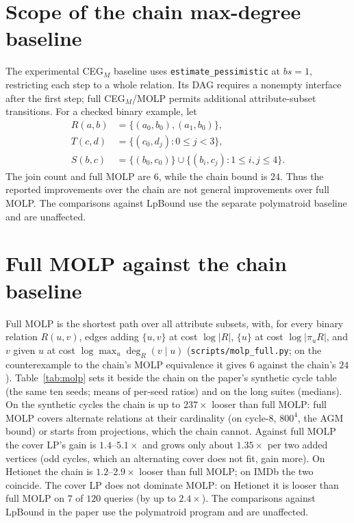 \documentclass[11pt]{article}
\begin{document}
\section{Scope of the chain max-degree baseline}
The experimental CEG$_M$ baseline uses \texttt{estimate\_pessimistic} at $bs=1$, restricting each step to a whole relation. Its DAG requires a nonempty interface after the first step; full CEG$_M$/MOLP permits additional attribute-subset transitions. For a checked binary example, let
\[
\begin{aligned}
R(a,b)&=\{(a_0,b_0),(a_1,b_0)\},\\
T(c,d)&=\{(c_0,d_j):0\le j<3\},\\
S(b,c)&=\{(b_0,c_0)\}\cup\{(b_i,c_j):1\le i,j\le4\}.
\end{aligned}
\]
The join count and full MOLP are $6$, while the chain bound is $24$. Thus the reported improvements over the chain are not general improvements over full MOLP. The comparisons against LpBound use the separate polymatroid baseline and are unaffected.

\section{Full MOLP against the chain baseline}
Full MOLP is the shortest path over all attribute subsets, with, for every
binary relation $R(u,v)$, edges adding $\{u,v\}$ at cost $\log|R|$, $\{u\}$
at cost $\log|\pi_uR|$, and $v$ given $u$ at cost $\log\max_u\deg_R(v\mid u)$
(\texttt{scripts/molp\_full.py}; on the counterexample to the chain's MOLP
equivalence it gives $6$ against the chain's $24$). Table~\ref{tab:molp} sets it beside the chain on the
paper's synthetic cycle table (the same ten seeds; means of per-seed
ratios) and on the long suites (medians). On the synthetic cycles the
chain is up to $237\times$ looser than full MOLP: full MOLP covers alternate
relations at their cardinality (on cycle-$8$, $800^4$, the AGM bound) or
starts from projections, which the chain cannot. Against full MOLP the
cover LP's gain is $1.4$--$5.1\times$ and grows only about $1.35\times$ per
two added vertices (odd cycles, which an alternating cover does not fit,
gain more). On Hetionet the chain is
$1.2$--$2.9\times$ looser than full MOLP; on IMDb the two coincide. The cover LP does not dominate MOLP: on Hetionet it is looser than full
MOLP on $7$ of $120$ queries (by up to $2.4\times$). The
comparisons against LpBound in the paper use the polymatroid program and
are unaffected.
\end{document}
